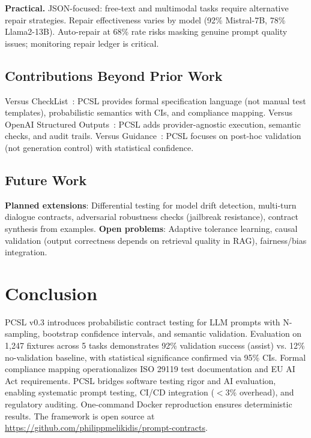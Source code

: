 \documentclass[sigconf]{acmart}
\begin{document}
\textbf{Practical.} JSON-focused: free-text and multimodal tasks require alternative repair strategies. Repair effectiveness varies by model (92\% Mistral-7B, 78\% Llama2-13B). Auto-repair at 68\% rate risks masking genuine prompt quality issues; monitoring repair ledger is critical.

\subsection{Contributions Beyond Prior Work}

Versus CheckList~\cite{ribeiro2020beyond}: PCSL provides formal specification language (not manual test templates), probabilistic semantics with CIs, and compliance mapping. Versus OpenAI Structured Outputs~\cite{openai2023structured}: PCSL adds provider-agnostic execution, semantic checks, and audit trails. Versus Guidance~\cite{guidance2023}: PCSL focuses on post-hoc validation (not generation control) with statistical confidence.

\subsection{Future Work}

\textbf{Planned extensions}: Differential testing for model drift detection, multi-turn dialogue contracts, adversarial robustness checks (jailbreak resistance), contract synthesis from examples. \textbf{Open problems}: Adaptive tolerance learning, causal validation (output correctness depends on retrieval quality in RAG), fairness/bias integration.

\section{Conclusion}

PCSL v0.3 introduces probabilistic contract testing for LLM prompts with N-sampling, bootstrap confidence intervals, and semantic validation. Evaluation on 1,247 fixtures across 5 tasks demonstrates 92\% validation success (assist) vs. 12\% no-validation baseline, with statistical significance confirmed via 95\% CIs. Formal compliance mapping operationalizes ISO 29119 test documentation and EU AI Act requirements. PCSL bridges software testing rigor and AI evaluation, enabling systematic prompt testing, CI/CD integration (\(<\)3\% overhead), and regulatory auditing. One-command Docker reproduction ensures deterministic results. The framework is open source at \url{https://github.com/philippmelikidis/prompt-contracts}.



\end{document}
